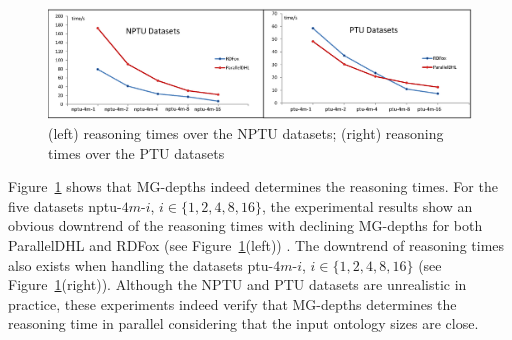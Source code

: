 \begin{figure}[htbp]
\begin{center}
\includegraphics[width=1\textwidth]{fig-diff-depths.eps}
\caption{(left) reasoning times over the NPTU datasets; (right)
  reasoning times over the PTU datasets}
\label{fig:diffdepths}
\end{center}
\end{figure}

Figure~\ref{fig:diffdepths} shows that MG-depths indeed determines
the reasoning times.
For the five datasets nptu-$4m$-$i$, $i\in\{1,2,4,8,16\}$, the experimental
results show an obvious downtrend of the reasoning times with declining MG-depths for
both ParallelDHL and RDFox (see Figure~\ref{fig:diffdepths}(left))
.
The downtrend of reasoning times also exists
when handling the datasets ptu-$4m$-$i$, $i\in\{1,2,4,8,16\}$ (see Figure~\ref{fig:diffdepths}(right)).
Although the NPTU and PTU datasets are unrealistic in practice, these experiments indeed
verify that MG-depths determines the reasoning time in parallel
considering that the input ontology sizes are close.

